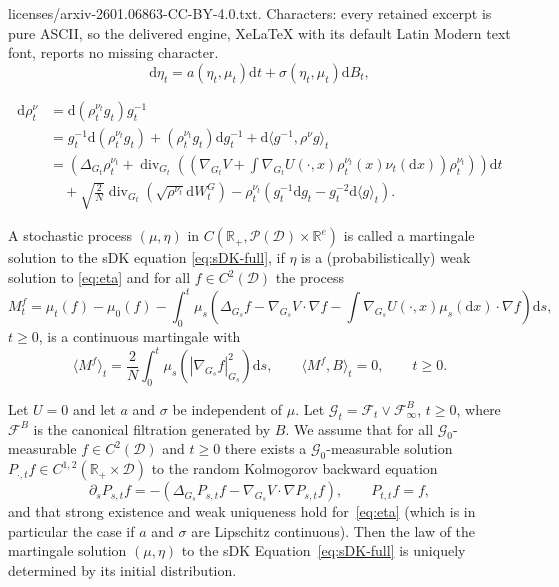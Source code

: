 \documentclass[10pt,a4paper]{amsart}
\newcommand{\cdummy}{\cdot}
\newcommand{\mathd}{\mathrm{d}}
\begin{document}
licenses/arxiv-2601.06863-CC-BY-4.0.txt. Characters: every retained excerpt is pure ASCII, so the delivered engine, XeLaTeX with its default Latin Modern text font, reports no missing character.
\begin{equation}\label{eq:eta}
    \mathd \eta_t = a (\eta_t, \mu_t) \mathd t + \sigma (\eta_t, \mu_t)
   \mathd B_t,
\end{equation}

\begin{align} \nonumber
  \mathd \rho^\nu_t & = \mathd (\rho^{\nu_t}_t g_t) g_t^{- 1}\\ \nonumber
  & = g_t^{- 1} \mathd (\rho^{\nu_t}_t
  g_t) + (\rho^{\nu_t}_t g_t) \mathd g_t^{- 1} + \mathd \langle g^{- 1},
  \rho^{\nu} g \rangle_t\\ \nonumber
  & = \left( \Delta_{G_t} \rho^{\nu_t}_t + \operatorname{div}_{G_t} \left(
  \left( \nabla_{G_t} V + \int \nabla_{G_t} U (\cdummy, x) \rho^{\nu_t}_t (x)
  \nu_t (\mathd x) \right) \rho^{\nu_t}_t \right) \right) \mathd t \\
  & \quad + \sqrt{\frac2N}\operatorname{div}_{G_t} \left( \sqrt{\rho^{\nu_t}} \mathd W^G_t \right)
   - \rho^{\nu_t}_t (g_t^{- 1} \mathd g_t - g_t^{- 2} \mathd \langle g \label{eq:sDK-full}
  \rangle_t) .
\end{align}

\begin{definition}\label{def:sDK-martingale-problem}
  A stochastic process $(\mu, \eta)$ in $C (\mathbb{R}_+, \mathcal{P} (\mathcal{D})
  \times \mathbb{R}^e)$ is called a martingale solution to the
  sDK equation \eqref{eq:sDK-full}, if $\eta$ is a (probabilistically) weak  solution to \eqref{eq:eta}
  and for all $f \in C^2 (\mathcal{D})$ the process
  \[ M^f_t = \mu_t (f) - \mu_0 (f) - \int_0^t \mu_s \left( \Delta_{G_s} f -
     \nabla_{G_s} V \cdummy \nabla f - \int \nabla_{G_s} U (\cdummy, x) \mu_s
     (\mathd x) \cdummy \nabla f \right) \mathd s, \]
  $t\ge 0$, is a continuous martingale with
  \[ \langle M^f \rangle_t = \frac{2}{N} \int_0^t \mu_s (| \nabla_{G_s} f
     |_{G_s}^2) \mathd s, \qquad \langle M^f, B \rangle_t = 0, \qquad t
     \geq 0. \]
\end{definition}

\begin{theorem}
Let $U = 0$ and let $a$ and $\sigma$ be independent of $\mu$. Let
$\mathcal{G}_t =\mathcal{F}_t \vee \mathcal{F}^B_{\infty}$, $t\ge 0$, where
$\mathcal{F}^B$ is the canonical filtration generated by $B$. We assume that
for all $\mathcal{G}_0$-measurable $f \in C^2 (\mathcal{D})$ and $t \geq 0$ there
exists a $\mathcal{G}_0$-measurable solution $P_{\cdummy, t} f \in C^{1, 2}
(\mathbb{R}_+ \times \mathcal{D})$ to the random Kolmogorov backward equation
\[ \partial_s P_{s, t} f = - (\Delta_{G_s} P_{s, t} f - \nabla_{G_s} V \cdummy
   \nabla P_{s, t} f), \qquad P_{t, t} f = f, \]
and that strong existence and weak uniqueness hold for~\eqref{eq:eta} (which is in particular the case if $a$ and $\sigma$ are Lipschitz continuous). Then the law of the martingale solution $(\mu, \eta)$ to
the sDK Equation~\eqref{eq:sDK-full} is uniquely determined by its initial distribution.
\end{theorem}
\end{document}

